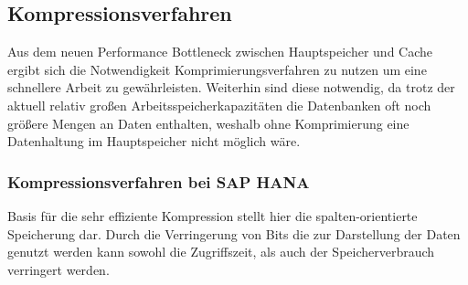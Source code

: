 \documentclass[a4paper, 12pt]{scrartcl}
\begin{document}
\newpage
\subsection{Kompressionsverfahren}
Aus dem neuen Performance Bottleneck zwischen Hauptspeicher und Cache ergibt sich die Notwendigkeit Komprimierungsverfahren zu nutzen um eine  schnellere Arbeit zu gewährleisten. Weiterhin sind diese notwendig, da trotz der aktuell relativ großen Arbeitsspeicherkapazitäten die Datenbanken oft noch größere Mengen an Daten enthalten, weshalb ohne Komprimierung eine Datenhaltung im Hauptspeicher nicht möglich wäre. 
\subsubsection{Kompressionsverfahren bei SAP HANA}
Basis für die sehr effiziente Kompression stellt hier die spalten-orientierte Speicherung dar. Durch die Verringerung von Bits die zur Darstellung der Daten genutzt werden kann sowohl die Zugriffszeit, als auch der Speicherverbrauch verringert werden.\\
\end{document}
